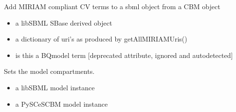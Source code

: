 \documentclass[letterpaper,10pt,english]{sphinxmanual}
\begin{document}

\begin{fulllineitems}
\label{\detokenize{modules_doc:cbmpy.CBXML.sbml_setCVterms}}
\pysigstartsignatures
{}
\pysigstopsignatures
\sphinxAtStartPar
Add MIRIAM compliant CV terms to a sbml object from a CBM object
\begin{itemize}
\item {} 
\sphinxAtStartPar
{} a libSBML SBase derived object

\item {} 
\sphinxAtStartPar
{} a dictionary of uri’s as produced by getAllMIRIAMUris()

\item {} 
\sphinxAtStartPar
{} is this a BQmodel term {[}deprecated attribute, ignored and autodetected{]}

\end{itemize}

\end{fulllineitems}


\begin{fulllineitems}
\label{\detokenize{modules_doc:cbmpy.CBXML.sbml_setCompartmentsL3}}
\pysigstartsignatures
{}
\pysigstopsignatures
\sphinxAtStartPar
Sets the model compartments.
\begin{itemize}
\item {} 
\sphinxAtStartPar
{} a libSBML model instance

\item {} 
\sphinxAtStartPar
{} a PySCeSCBM model instance

\end{itemize}

\end{fulllineitems}
\end{document}
